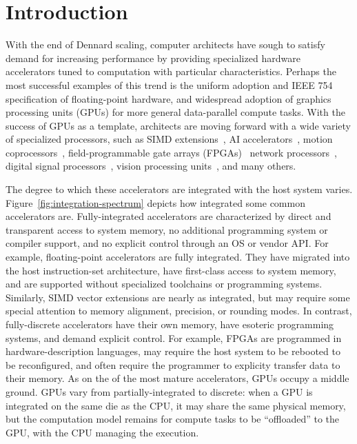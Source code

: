 
\chapter{Introduction}


With the end of Dennard scaling, computer architects have sough to satisfy demand for increasing performance by providing specialized hardware accelerators tuned to computation with particular characteristics.
Perhaps the most successful examples of this trend is the uniform adoption and IEEE 754 specification of floating-point hardware, and widespread adoption of graphics processing units (GPUs) for more general data-parallel compute tasks.
With the success of GPUs as a template, architects are moving forward with a wide variety of specialized processors, such as
SIMD extensions~,
AI accelerators~,
motion coprocessors~,
field-programmable gate arrays (FPGAs)~
network processors~,
digital signal processors~,
vision processing units~,
and many others.

The degree to which these accelerators are integrated with the host system varies.
Figure~\ref{fig:integration-spectrum} depicts how integrated some common accelerators are.
Fully-integrated accelerators are characterized by direct and transparent access to system memory, no additional programming system or compiler support, and no explicit control through an OS or vendor API.
For example, floating-point accelerators are fully integrated.
They have migrated into the host instruction-set architecture, have first-class access to system memory, and are supported without specialized toolchains or programming systems.
Similarly, SIMD vector extensions are nearly as integrated, but may require some special attention to memory alignment, precision, or rounding modes.
In contrast, fully-discrete accelerators have their own memory, have esoteric programming systems, and demand explicit control.
For example, FPGAs are programmed in hardware-description languages, may require the host system to be rebooted to be reconfigured, and often require the programmer to explicity transfer data to their memory.
As on the of the most mature accelerators, GPUs occupy a middle ground.
GPUs vary from partially-integrated to discrete: when a GPU is integrated on the same die as the CPU, it may share the same physical memory, but the computation model remains for compute tasks to be ``offloaded'' to the GPU, with the CPU managing the execution.

